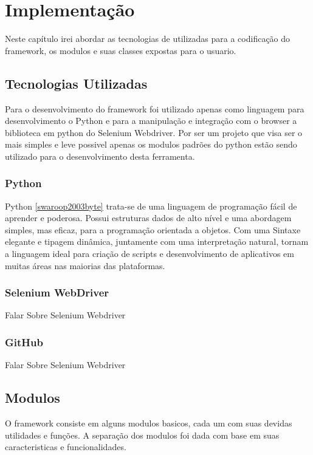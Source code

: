 %
%

\chapter{Implementação}

    Neste capítulo irei abordar as tecnologias de utilizadas para a codificação do framework,
    os modulos e suas classes expostas para o usuario.


\section{Tecnologias Utilizadas}

    Para o desenvolvimento do framework foi utilizado apenas como linguagem para desenvolvimento o Python
    e para a manipulação e integração com o browser a biblioteca em python do Selenium Webdriver. Por ser um
    projeto que visa ser o mais simples e leve possivel apenas os modulos padrões do python estão sendo utilizado
    para o desenvolvimento desta ferramenta.


    \subsection{Python}

        Python \ref{swaroop2003byte} trata-se de uma linguagem de programação fácil de aprender e poderosa.
        Possui estruturas dados de alto nível e uma abordagem simples, mas eficaz, para a programação orientada
        a objetos. Com uma Sintaxe elegante e tipagem dinâmica, juntamente com uma interpretação natural, tornam
        a linguagem ideal para criação de scripts e desenvolvimento de aplicativos em muitas áreas nas maiorias das plataformas.

    \subsection{Selenium WebDriver}
        Falar Sobre Selenium Webdriver
    \subsection{GitHub}
        Falar Sobre Selenium Webdriver

\section{Modulos}

    O framework consiste em alguns modulos basicos, cada um com suas devidas utilidades e funções.
    A separação dos modulos foi dada com base em suas caracteristicas e funcionalidades.

